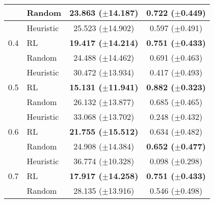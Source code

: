 \begin{table}[!h]
\begin{tabular}{llrrrr}
 & Random &\multicolumn{2}{c}{ \cellcolor[HTML]{ffffff} \color{black} \textbf{{23.863} ($\pm{}$14.187)} } &\multicolumn{2}{c}{ \cellcolor[HTML]{ffffff} \color{black} \textbf{{0.722} ($\pm{}$0.449)} }  \\
\midrule
\multirow[c]{3}{*}{0.4} & Heuristic &\multicolumn{2}{c}{ \cellcolor[HTML]{ffffff} \color{black} {25.523} ($\pm{}$14.902) } &\multicolumn{2}{c}{ \cellcolor[HTML]{ffffff} \color{black} {0.597} ($\pm{}$0.491) }  \\
 & RL &\multicolumn{2}{c}{ \cellcolor[HTML]{ffffff} \color{black} \textbf{{19.417} ($\pm{}$14.214)} } &\multicolumn{2}{c}{ \cellcolor[HTML]{ffffff} \color{black} \textbf{{0.751} ($\pm{}$0.433)} }  \\
 & Random &\multicolumn{2}{c}{ \cellcolor[HTML]{ffffff} \color{black} {24.488} ($\pm{}$14.462) } &\multicolumn{2}{c}{ \cellcolor[HTML]{ffffff} \color{black} {0.691} ($\pm{}$0.463) }  \\
\midrule
\multirow[c]{3}{*}{0.5} & Heuristic &\multicolumn{2}{c}{ \cellcolor[HTML]{ffffff} \color{black} {30.472} ($\pm{}$13.934) } &\multicolumn{2}{c}{ \cellcolor[HTML]{ffffff} \color{black} {0.417} ($\pm{}$0.493) }  \\
 & RL &\multicolumn{2}{c}{ \cellcolor[HTML]{ffffff} \color{black} \textbf{{15.131} ($\pm{}$11.941)} } &\multicolumn{2}{c}{ \cellcolor[HTML]{ffffff} \color{black} \textbf{{0.882} ($\pm{}$0.323)} }  \\
 & Random &\multicolumn{2}{c}{ \cellcolor[HTML]{ffffff} \color{black} {26.132} ($\pm{}$13.877) } &\multicolumn{2}{c}{ \cellcolor[HTML]{ffffff} \color{black} {0.685} ($\pm{}$0.465) }  \\
\midrule
\multirow[c]{3}{*}{0.6} & Heuristic &\multicolumn{2}{c}{ \cellcolor[HTML]{ffffff} \color{black} {33.068} ($\pm{}$13.702) } &\multicolumn{2}{c}{ \cellcolor[HTML]{ffffff} \color{black} {0.248} ($\pm{}$0.432) }  \\
 & RL &\multicolumn{2}{c}{ \cellcolor[HTML]{ffffff} \color{black} \textbf{{21.755} ($\pm{}$15.512)} } &\multicolumn{2}{c}{ \cellcolor[HTML]{ffffff} \color{black} {0.634} ($\pm{}$0.482) }  \\
 & Random &\multicolumn{2}{c}{ \cellcolor[HTML]{ffffff} \color{black} {24.908} ($\pm{}$14.384) } &\multicolumn{2}{c}{ \cellcolor[HTML]{ffffff} \color{black} \textbf{{0.652} ($\pm{}$0.477)} }  \\
\midrule
\multirow[c]{3}{*}{0.7} & Heuristic &\multicolumn{2}{c}{ \cellcolor[HTML]{ffffff} \color{black} {36.774} ($\pm{}$10.328) } &\multicolumn{2}{c}{ \cellcolor[HTML]{ffffff} \color{black} {0.098} ($\pm{}$0.298) }  \\
 & RL &\multicolumn{2}{c}{ \cellcolor[HTML]{ffffff} \color{black} \textbf{{17.917} ($\pm{}$14.258)} } &\multicolumn{2}{c}{ \cellcolor[HTML]{ffffff} \color{black} \textbf{{0.751} ($\pm{}$0.433)} }  \\
 & Random &\multicolumn{2}{c}{ \cellcolor[HTML]{ffffff} \color{black} {28.135} ($\pm{}$13.916) } &\multicolumn{2}{c}{ \cellcolor[HTML]{ffffff} \color{black} {0.546} ($\pm{}$0.498) }  \\
\bottomrule
\end{tabular}
\end{table}